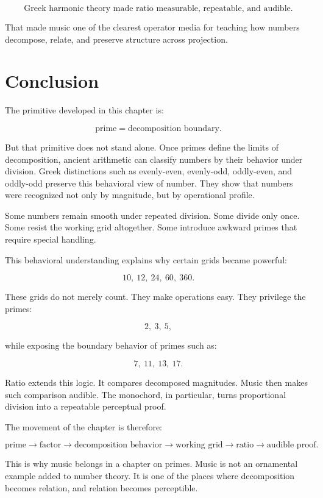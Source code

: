 \documentclass[11pt]{book}
\begin{document}
\[
\text{Greek harmonic theory made ratio measurable, repeatable, and audible.}
\]

That made music one of the clearest operator media for teaching how numbers decompose, relate, and preserve structure across projection.

\section{Conclusion}

The primitive developed in this chapter is:

\[
\text{prime} = \text{decomposition boundary}.
\]

But that primitive does not stand alone. Once primes define the limits of decomposition, ancient arithmetic can classify numbers by their behavior under division. Greek distinctions such as evenly-even, evenly-odd, oddly-even, and oddly-odd preserve this behavioral view of number.  They show that numbers were recognized not only by magnitude, but by operational profile.

Some numbers remain smooth under repeated division. Some divide only once. Some resist the working grid altogether. Some introduce awkward primes that require special handling.

This behavioral understanding explains why certain grids became powerful:

\[
10,\ 12,\ 24,\ 60,\ 360.
\]

These grids do not merely count. They make operations easy. They privilege the primes:

\[
2,\ 3,\ 5,
\]

while exposing the boundary behavior of primes such as:

\[
7,\ 11,\ 13,\ 17.
\]

Ratio extends this logic. It compares decomposed magnitudes. Music then makes such comparison audible. The monochord, in particular, turns proportional division into a repeatable perceptual proof.

The movement of the chapter is therefore:

\[
\text{prime}
\rightarrow
\text{factor}
\rightarrow
\text{decomposition behavior}
\rightarrow
\text{working grid}
\rightarrow
\text{ratio}
\rightarrow
\text{audible proof}.
\]

This is why music belongs in a chapter on primes. Music is not an ornamental example added to number theory. It is one of the places where decomposition becomes relation, and relation becomes perceptible.
\end{document}
